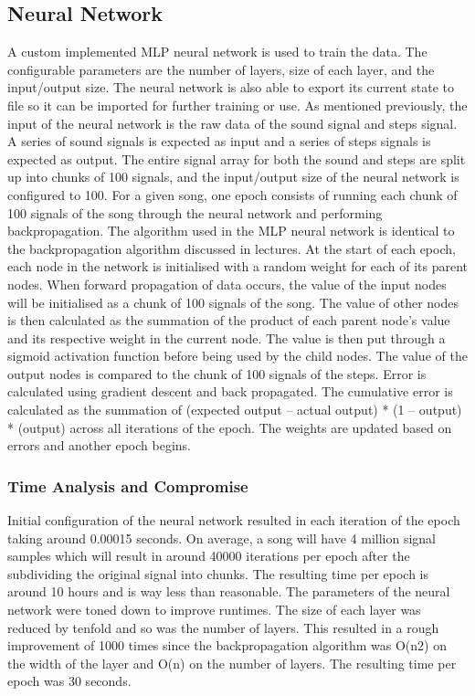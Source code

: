 \subsection{Neural Network}
A custom implemented MLP neural network is used to train the data. The configurable parameters are the number of layers, size of each layer, and the input/output size. The neural network is also able to export its current state to file so it can be imported for further training or use.
As mentioned previously, the input of the neural network is the raw data of the sound signal and steps signal. A series of sound signals is expected as input and a series of steps signals is expected as output. The entire signal array for both the sound and steps are split up into chunks of 100 signals, and the input/output size of the neural network is configured to 100. For a given song, one epoch consists of running each chunk of 100 signals of the song through the neural network and performing backpropagation.
The algorithm used in the MLP neural network is identical to the backpropagation algorithm discussed in lectures. At the start of each epoch, each node in the network is initialised with a random weight for each of its parent nodes. When forward propagation of data occurs, the value of the input nodes will be initialised as a chunk of 100 signals of the song. The value of other nodes is then calculated as the summation of the product of each parent node’s value and its respective weight in the current node. The value is then put through a sigmoid activation function before being used by the child nodes. The value of the output nodes is compared to the chunk of 100 signals of the steps. Error is calculated using gradient descent and back propagated. The cumulative error is calculated as the summation of (expected output – actual output) * (1 – output) * (output) across all iterations of the epoch. The weights are updated based on errors and another epoch begins. 
\subsubsection{Time Analysis and Compromise}
Initial configuration of the neural network resulted in each iteration of the epoch taking around 0.00015 seconds. On average, a song will have 4 million signal samples which will result in around 40000 iterations per epoch after the subdividing the original signal into chunks. The resulting time per epoch is around 10 hours and is way less than reasonable. The parameters of the neural network were toned down to improve runtimes. The size of each layer was reduced by tenfold and so was the number of layers. This resulted in a rough improvement of 1000 times since the backpropagation algorithm was O(n2) on the width of the layer and O(n) on the number of layers. The resulting time per epoch was 30 seconds.\\

